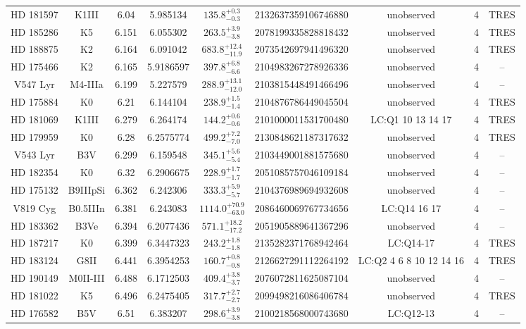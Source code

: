 \begin{table*}
\begin{tabular}{ccccccccc}
HD 181597 & K1III & 6.04 & 5.985134 & $135.8^{+0.3}_{-0.3}$ & 2132637359106746880 & unobserved & 4 & TRES \\
HD 185286 & K5 & 6.151 & 6.055302 & $263.5^{+3.9}_{-3.8}$ & 2078199335828818432 & unobserved & 4 & TRES \\
HD 188875 & K2 & 6.164 & 6.091042 & $683.8^{+12.4}_{-11.9}$ & 2073542697941496320 & unobserved & 4 & TRES \\
HD 175466 & K2 & 6.165 & 5.9186597 & $397.8^{+6.8}_{-6.6}$ & 2104983267278926336 & unobserved & 4 & -- \\
V547 Lyr & M4-IIIa & 6.199 & 5.227579 & $288.9^{+13.1}_{-12.0}$ & 2103815448491466496 & unobserved & 4 & -- \\
HD 175884 & K0 & 6.21 & 6.144104 & $238.9^{+1.5}_{-1.4}$ & 2104876786449045504 & unobserved & 4 & TRES \\
HD 181069 & K1III & 6.279 & 6.264174 & $144.2^{+0.6}_{-0.6}$ & 2101000011531700480 & LC:Q1 10 13 14 17 & 4 & TRES \\
HD 179959 & K0 & 6.28 & 6.2575774 & $499.2^{+7.2}_{-7.0}$ & 2130848621187317632 & unobserved & 4 & TRES \\
V543 Lyr & B3V & 6.299 & 6.159548 & $345.1^{+5.6}_{-5.4}$ & 2103449001881575680 & unobserved & 4 & -- \\
HD 182354 & K0 & 6.32 & 6.2906675 & $228.9^{+1.7}_{-1.7}$ & 2051085757046109184 & unobserved & 4 & -- \\
HD 175132 & B9IIIpSi & 6.362 & 6.242306 & $333.3^{+5.9}_{-5.7}$ & 2104376989694932608 & unobserved & 4 & -- \\
V819 Cyg & B0.5IIIn & 6.381 & 6.243083 & $1114.0^{+70.9}_{-63.0}$ & 2086460069767734656 & LC:Q14 16 17 & 4 & -- \\
HD 183362 & B3Ve & 6.394 & 6.2077436 & $571.1^{+18.2}_{-17.2}$ & 2051905889641367296 & unobserved & 4 & -- \\
HD 187217 & K0 & 6.399 & 6.3447323 & $243.2^{+1.8}_{-1.8}$ & 2135282371768942464 & LC:Q14-17 & 4 & TRES \\
HD 183124 & G8II & 6.441 & 6.3954253 & $160.7^{+0.8}_{-0.8}$ & 2126627291112264192 & LC:Q2 4 6 8 10 12 14 16 & 4 & TRES \\
HD 190149 & M0II-III & 6.488 & 6.1712503 & $409.4^{+3.8}_{-3.7}$ & 2076072811625087104 & unobserved & 4 & -- \\
HD 181022 & K5 & 6.496 & 6.2475405 & $317.7^{+2.7}_{-2.7}$ & 2099498216086406784 & unobserved & 4 & TRES \\
HD 176582 & B5V & 6.51 & 6.383207 & $298.6^{+3.9}_{-3.8}$ & 2100218568000743680 & LC:Q12-13 & 4 & -- \\

\end{tabular}
\end{table*}

